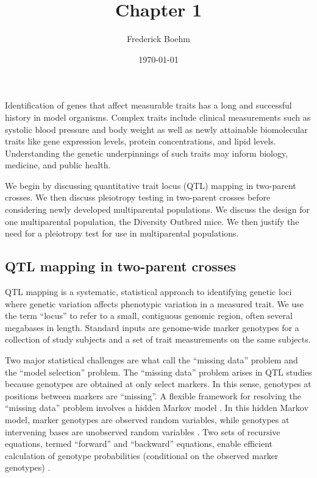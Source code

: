 \documentclass[]{article}
\title{Chapter 1}
\author{Frederick Boehm}
\date{\today}
\begin{document}
\doublespacing
\maketitle

\listoftodos
\listoffigures
\listoftables




Identification of genes that affect measurable traits has a long and
successful history in model organisms. Complex traits include
clinical measurements such as systolic blood pressure and body weight as
well as newly attainable biomolecular traits like gene expression
levels, protein concentrations, and lipid levels. Understanding the
genetic underpinnings of such traits may inform biology,
medicine, and public health.

We begin by discussing quantitative trait locus (QTL) mapping in two-parent crosses. We then discuss pleiotropy testing in two-parent crosses before considering newly developed multiparental populations. We discuss the design for one multiparental population, the Diversity Outbred mice. We then justify the need for a pleiotropy test for use in multiparental populations.


\subsection{QTL mapping in two-parent crosses}

QTL mapping is a systematic, statistical approach to identifying genetic
loci where genetic variation affects phenotypic variation in a measured trait.
We use the term ``locus'' to refer to a small, contiguous genomic region, often
several megabases in length. Standard inputs are genome-wide marker genotypes for a collection of study subjects and a set of trait measurements on the same subjects.

Two major statistical challenges are what \citet{broman2009guide} call 
the ``missing data'' problem and the ``model selection'' problem. 
The ``missing data'' problem arises in QTL studies because genotypes are obtained
at only select markers. In this sense, genotypes at positions between
markers are ``missing''.
A flexible framework for resolving the ``missing data'' problem involves a
hidden Markov model \citep{broman2009guide}. 
In this hidden Markov model, marker genotypes are observed random variables, 
while genotypes at intervening bases are unobserved random variables \citep{broman2009guide,broman2006use}. 
Two sets of recursive equations, termed ``forward'' and ``backward'' equations, enable efficient calculation of genotype probabilities (conditional on the observed marker genotypes) \citep{baum1970maximization}.
\end{document}
